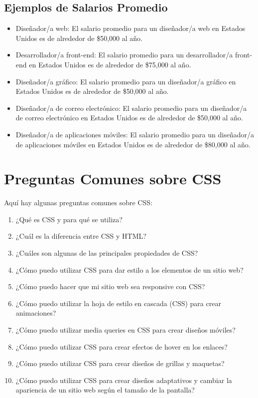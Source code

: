 \documentclass{article}
\begin{document}
\subsection{Ejemplos de Salarios Promedio}
\begin{itemize}
	\item Diseñador/a web: El salario promedio para un diseñador/a web en Estados Unidos es de alrededor de \$50,000 al año.
	\item Desarrollador/a front-end: El salario promedio para un desarrollador/a front-end en Estados Unidos es de alrededor de \$75,000 al año.
	\item Diseñador/a gráfico: El salario promedio para un diseñador/a gráfico en Estados Unidos es de alrededor de \$50,000 al año.
	\item Diseñador/a de correo electrónico: El salario promedio para un diseñador/a de correo electrónico en Estados Unidos es de alrededor de \$50,000 al año.
	\item Diseñador/a de aplicaciones móviles: El salario promedio para un diseñador/a de aplicaciones móviles en Estados Unidos es de alrededor de \$80,000 al año.
\end{itemize}

\section{Preguntas Comunes sobre CSS}
Aquí hay algunas preguntas comunes sobre CSS:
\begin{enumerate}
	\item ¿Qué es CSS y para qué se utiliza?
	\item ¿Cuál es la diferencia entre CSS y HTML?
	\item ¿Cuáles son algunas de las principales propiedades de CSS?
	\item ¿Cómo puedo utilizar CSS para dar estilo a los elementos de un sitio web?
	\item ¿Cómo puedo hacer que mi sitio web sea responsive con CSS?
	\item ¿Cómo puedo utilizar la hoja de estilo en cascada (CSS) para crear animaciones?
	\item ¿Cómo puedo utilizar media queries en CSS para crear diseños móviles?
	\item ¿Cómo puedo utilizar CSS para crear efectos de hover en los enlaces?
	\item ¿Cómo puedo utilizar CSS para crear diseños de grillas y maquetas?
	\item ¿Cómo puedo utilizar CSS para crear diseños adaptativos y cambiar la apariencia de un sitio web según el tamaño de la pantalla?
\end{enumerate}
\end{document}
